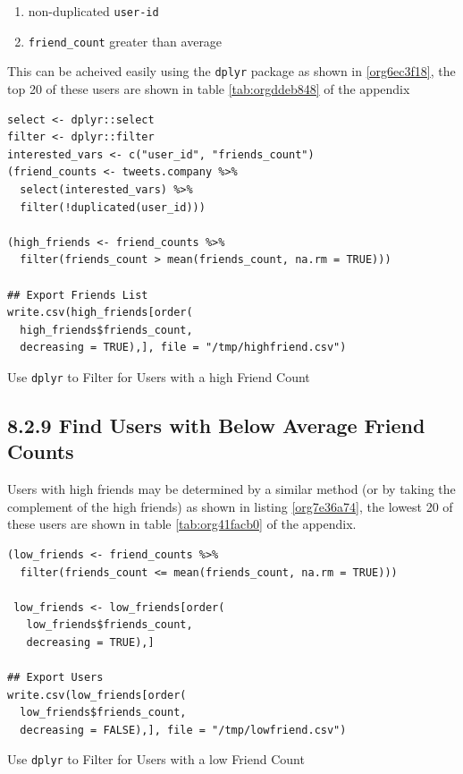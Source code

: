\documentclass[11pt]{article}
\begin{document}
\begin{enumerate}
\item non-duplicated \texttt{user-id}
\item \texttt{friend\_count} greater than average
\end{enumerate}

This can be acheived easily using the \texttt{dplyr} package as shown in \ref{org6ec3f18}, the top 20 of these users are shown in table \ref{tab:orgddeb848} of the appendix

\begin{listing}[htbp]
\begin{verbatim}
select <- dplyr::select
filter <- dplyr::filter
interested_vars <- c("user_id", "friends_count")
(friend_counts <- tweets.company %>%
  select(interested_vars) %>%
  filter(!duplicated(user_id)))

(high_friends <- friend_counts %>%
  filter(friends_count > mean(friends_count, na.rm = TRUE)))

## Export Friends List
write.csv(high_friends[order(
  high_friends$friends_count,
  decreasing = TRUE),], file = "/tmp/highfriend.csv")
\end{verbatim}
\caption{\label{org6ec3f18}Use \texttt{dplyr} to Filter for Users with a high Friend Count}
\end{listing}

\subsection{8.2.9 Find Users with Below Average Friend Counts}
\label{sec:org735251e}
Users with high friends may be determined by a similar method (or by taking the complement of the high friends) as shown in listing \ref{org7e36a74}, the lowest 20 of these users are shown in table \ref{tab:org41facb0} of the appendix.

\begin{listing}[htbp]
\begin{verbatim}
(low_friends <- friend_counts %>%
  filter(friends_count <= mean(friends_count, na.rm = TRUE)))

 low_friends <- low_friends[order(
   low_friends$friends_count,
   decreasing = TRUE),]

## Export Users
write.csv(low_friends[order(
  low_friends$friends_count,
  decreasing = FALSE),], file = "/tmp/lowfriend.csv")
\end{verbatim}
\caption{\label{org7e36a74}Use \texttt{dplyr} to Filter for Users with a low Friend Count}
\end{listing}
\end{document}
